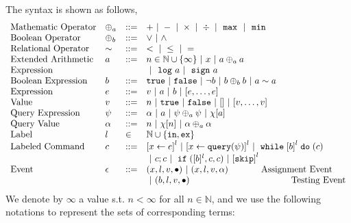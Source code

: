 The syntax is shown as follows,
\[
\begin{array}{llll}
\mbox{Mathematic Operator} 
& \oplus_a & ::= & + ~|~ - ~|~ \times 
%
~|~ \div 
~|~ \emax 
~|~ \emin \\ 
\mbox{Boolean Operator} 
& \oplus_b & ::= & \lor ~|~ \land
\\
%
\mbox{Relational Operator} 
& \sim & ::= & < ~|~ \leq ~|~ =
\\ 
%
\mbox{Extended Arithmetic} 
& \aexpr & ::= & 
n \in \mathbb{N}\cup\{\infty\} ~|~ {x} ~|~ \aexpr \oplus_a \aexpr 
\\ 
\mbox{Expression}
& & &
~|~ \elog \aexpr ~|~ \esign \aexpr
\\
%
\mbox{Boolean Expression} & \bexpr & ::= & 
%
\etrue ~|~ \efalse ~|~ \neg \bexpr
 ~|~ \bexpr \oplus_b \bexpr
%
~|~ \aexpr \sim \aexpr 
\\
%
\mbox{Expression} & \expr & ::= & v ~|~ \aexpr ~|~ \bexpr 
~|~ [\expr, \dots, \expr]
\\ 
%
\mbox{Value} 
& v & ::= & { n ~|~ \etrue ~|~ \efalse ~|~ [] ~|~ [v, \dots, v]} 
\\
%
\mbox{Query Expression} 
& {\qexpr} & ::= 
& { \qval ~|~ \aexpr ~|~ \qexpr \oplus_a \qexpr ~|~ \chi[\aexpr]} 
\\
%
\mbox{Query Value} & \qval & ::= 
& {n ~|~ \chi[n] ~|~ \qval \oplus_a \qval}
\\
%
\mbox{Label} 
& l & \in & \mathbb{N} \cup \{\lin, \lex\} 
\\ 
%
\mbox{Labeled Command} 
& {c} & ::= & \clabel{\assign{x}{\expr}}^{l} ~|~ \clabel{\assign{x}{\query(\qexpr)}}^{l}
~|~ {\ewhile \clabel{\bexpr}^{l} \edo ({c}) }
\\
&&&
~|~ {c};{c} 
~|~ \eif(\clabel{\bexpr}{}^l , {c}, {c}) 
~|~ \clabel{\eskip}^l\\ 
\mbox{Event} 
& \event & ::= & 
 ({x}, l, v, \bullet) ~|~ ({x}, l, v, \qval) ~~~~~~~~~~~ \mbox{Assignment Event} \\
&&& ~|~(\bexpr, l, v, \bullet) ~~~~~~~~~~~~~~~~~~~~~~~~~~~~~~~~~~ \mbox{Testing Event}
\\
\end{array}
\]
We denote by $\infty$ a value s.t. $n < \infty $ for all $n \in \mathbb{N}$, and we use the following notations to represent the sets of corresponding terms:
